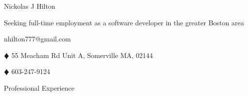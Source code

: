 \documentclass{article}
\newcommand{\lineseparator}[1]{\noindent\makebox[\linewidth]{\rule{\textwidth}{#1}}}
\begin{document}
\begin{minipage}[t]{0.4\textwidth}
  \hspace{-6.5mm}
  {\Huge Nickolas J Hilton }
\end{minipage}
\hspace{-6.5mm}
\begin{minipage}[b]{0.6\textwidth}
  \begin{flushright}
    {\small Seeking full-time employment as a software developer in the greater Boston area }
  \end{flushright}
\end{minipage}
\vspace{1mm}
\lineseparator{1.5pt}
\vspace{-2mm}
\begin{center}
  nhilton777@gmail.com 
  \begin{inparaitem}
  \item[$\vardiamond$] 55 Meacham Rd Unit A, Somerville MA, 02144
  \item[$\vardiamond$] 603-247-9124 
  \end{inparaitem}
\end{center}
{\Large Professional Experience } \\
\lineseparator{0.5pt}
\\[4mm]
\end{document}
